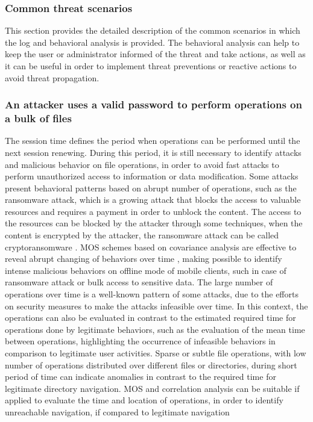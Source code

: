 \documentclass[twocolumn]{svjour3}          %
\begin{document}
\subsubsection{Common threat scenarios}
\label{sec_common}
This section provides the detailed description of the common scenarios in which the log and behavioral analysis is provided. The behavioral analysis can help to keep the user or administrator informed of the threat and take actions, as well as it can be useful in order to implement threat preventions or reactive actions to avoid threat propagation.

\subsubsection{An attacker uses a valid password to perform operations on a bulk of files}
\label{sec_attacker_valid}
The session time defines the period when operations can be performed until the next session renewing. During this period, it is still necessary to identify attacks and malicious behavior on file operations, in order to avoid fast attacks to perform unauthorized access to information or data modification. Some attacks present behavioral patterns based on abrupt number of operations, such as the ransomware attack, which is a growing attack \cite{McAfee2015} that blocks the access to valuable resources and requires a payment in order to unblock the content. The access to the resources can be blocked by the attacker through some techniques, when the content is encrypted by the attacker, the ransomware attack can be called cryptoransomware \cite{kaspersky2014}.
MOS schemes based on covariance analysis are effective to reveal abrupt changing of behaviors over time \cite{tenorio2013greatest}, making possible to identify intense malicious behaviors on offline mode of mobile clients, such in case of ransomware attack or bulk access to sensitive data.
The large number of operations over time is a well-known pattern of some attacks, due to the efforts on security measures to make the attacks infeasible over time. In this context, the operations can also be evaluated in contrast to the estimated required time for operations done by legitimate behaviors, such as the evaluation of the mean time between operations, highlighting the occurrence of infeasible behaviors in comparison to legitimate user activities.
Sparse or subtle file operations, with low number of operations distributed over different files or directories, during short period of time can indicate anomalies in contrast to the required time for legitimate directory navigation. MOS and correlation analysis can be suitable if applied to evaluate the time and location of operations, in order to identify unreachable navigation, if compared to legitimate navigation
\end{document}
